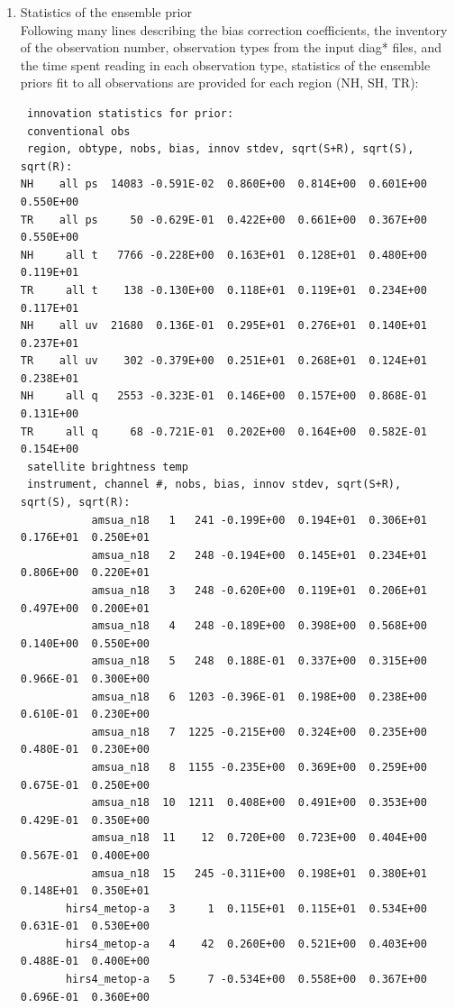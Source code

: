 \begin{enumerate}
\item Statistics of the ensemble prior\\
Following many lines describing the bias correction coefficients, the inventory of the observation number, observation types from the input diag* files, and the time spent reading in each observation type, statistics of the ensemble priors fit to all observations are provided for each region (NH, SH, TR):

\begin{footnotesize}
\begin{verbatim}
 innovation statistics for prior:
 conventional obs
 region, obtype, nobs, bias, innov stdev, sqrt(S+R), sqrt(S), sqrt(R):
NH    all ps  14083 -0.591E-02  0.860E+00  0.814E+00  0.601E+00  0.550E+00
TR    all ps     50 -0.629E-01  0.422E+00  0.661E+00  0.367E+00  0.550E+00
NH     all t   7766 -0.228E+00  0.163E+01  0.128E+01  0.480E+00  0.119E+01
TR     all t    138 -0.130E+00  0.118E+01  0.119E+01  0.234E+00  0.117E+01
NH    all uv  21680  0.136E-01  0.295E+01  0.276E+01  0.140E+01  0.237E+01
TR    all uv    302 -0.379E+00  0.251E+01  0.268E+01  0.124E+01  0.238E+01
NH     all q   2553 -0.323E-01  0.146E+00  0.157E+00  0.868E-01  0.131E+00
TR     all q     68 -0.721E-01  0.202E+00  0.164E+00  0.582E-01  0.154E+00
 satellite brightness temp
 instrument, channel #, nobs, bias, innov stdev, sqrt(S+R), sqrt(S), sqrt(R):
           amsua_n18   1   241 -0.199E+00  0.194E+01  0.306E+01  0.176E+01  0.250E+01
           amsua_n18   2   248 -0.194E+00  0.145E+01  0.234E+01  0.806E+00  0.220E+01
           amsua_n18   3   248 -0.620E+00  0.119E+01  0.206E+01  0.497E+00  0.200E+01
           amsua_n18   4   248 -0.189E+00  0.398E+00  0.568E+00  0.140E+00  0.550E+00
           amsua_n18   5   248  0.188E-01  0.337E+00  0.315E+00  0.966E-01  0.300E+00
           amsua_n18   6  1203 -0.396E-01  0.198E+00  0.238E+00  0.610E-01  0.230E+00
           amsua_n18   7  1225 -0.215E+00  0.324E+00  0.235E+00  0.480E-01  0.230E+00
           amsua_n18   8  1155 -0.235E+00  0.369E+00  0.259E+00  0.675E-01  0.250E+00
           amsua_n18  10  1211  0.408E+00  0.491E+00  0.353E+00  0.429E-01  0.350E+00
           amsua_n18  11    12  0.720E+00  0.723E+00  0.404E+00  0.567E-01  0.400E+00
           amsua_n18  15   245 -0.311E+00  0.198E+01  0.380E+01  0.148E+01  0.350E+01
       hirs4_metop-a   3     1  0.115E+01  0.115E+01  0.534E+00  0.631E-01  0.530E+00
       hirs4_metop-a   4    42  0.260E+00  0.521E+00  0.403E+00  0.488E-01  0.400E+00
       hirs4_metop-a   5     7 -0.534E+00  0.558E+00  0.367E+00  0.696E-01  0.360E+00

\end{verbatim}
\end{footnotesize}
\end{enumerate}
